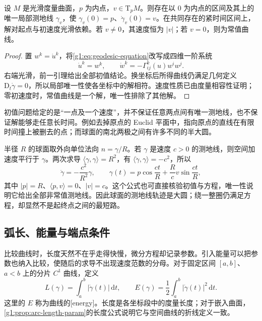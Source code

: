 \begin{proposition}
	\label{g1:prop:geodesic-initial-values}
	设 \(M\) 是光滑度量曲面，\(p\) 为内点，\(v\in \mathrm{T}_pM\)。则存在以 \(0\) 为内点的区间及其上的唯一局部测地线 \(\gamma_v\)，使 \(\gamma_v(0)=p\)、\(\dot\gamma_v(0)=v\)。在共同存在的紧时间区间上，解对起点与初速度光滑依赖。若 \(v\ne0\)，其速度恒为 \(|v|\)；若 \(v=0\)，则为常值曲线。
\end{proposition}
\begin{proof}
	置 \(w^k=\dot u^k\)，将\eqref{g1:eq:geodesic-equation}改写成四维一阶系统
	\[
		\dot u^k=w^k,\qquad \dot w^k=-\Gamma^k_{ij}(u)w^iw^j.
	\]
	右端光滑，前一引理给出全部初值结论。换坐标后所得曲线仍满足几何定义 \(\mathrm{D}_t\dot\gamma=0\)，所以局部唯一性使各坐标中的解相符。速度性质已由度量相容性证明；零初速度时，常值曲线是一个解，唯一性排除了其他解。
\end{proof}

初值问题给定的是“一点及一个速度”，并不保证任意两点间有唯一测地线，也不保证解能够走任意长时间。例如去掉原点的 Euclid 平面中，指向原点的直线在有限时间撞上被删去的点；而球面的南北两极之间有许多不同的半大圆。

\begin{example}
	\label{g1:exm:sphere-geodesics}
	半径 \(R\) 的球面取外向单位法向 \(n=\gamma/R\)。若 \(\gamma\) 是速度 \(c>0\) 的测地线，则空间加速度平行于 \(\gamma\)。两次求导 \(\langle\gamma,\gamma\rangle=R^2\)，有 \(\langle\ddot\gamma,\gamma\rangle=-c^2\)，所以
	\[
		\ddot\gamma=-\frac{c^2}{R^2}\gamma,\qquad
		\gamma(t)=p\cos\frac{ct}{R}+\frac{R}{c}v\sin\frac{ct}{R},
	\]
	其中 \(|p|=R\)、\(\langle p,v\rangle=0\)、\(|v|=c\)。这个公式也可直接核验初值与方程，唯一性说明它给出全部非常值测地线。因此球面的测地线轨迹是大圆；绕一整圈仍满足方程，却显然不是起终点之间的最短路。
\end{example}

\subsection{弧长、能量与端点条件}
\label{g1:subsec:0902:02}

比较曲线时，长度天然不在乎走得快慢，微分方程却记录参数。引入能量可以把参数也纳入比较，使随后的求导不出现速度范数的分母。对于固定区间 \([a,b]\)、\(a<b\) 上的分片 \(C^1\) 曲线，定义
\[
	L(\gamma)=\int_a^b|\dot\gamma(t)|\,\mathrm{d}t,\qquad
	E(\gamma)=\frac12\int_a^b|\dot\gamma(t)|^2\,\mathrm{d}t.
\]
这里的 \(E\) 称为曲线的[energy]。长度是各坐标段中的度量长度；对于嵌入曲面，\cref{g1:prop:arc-length-param}的长度公式说明它与空间曲线的折线定义一致。

